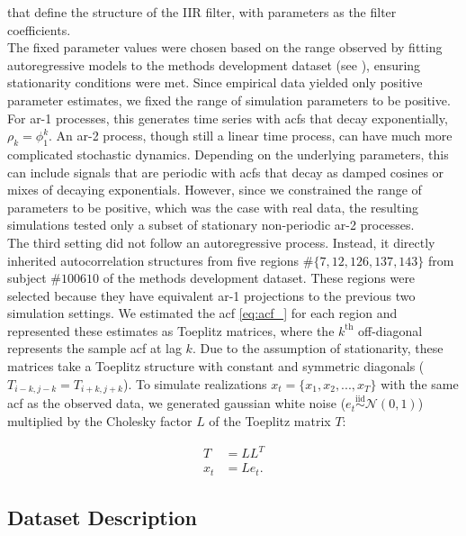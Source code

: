 \documentclass[main.tex]{subfiles}
\begin{document}
that define the structure of the IIR filter, with parameters as the filter coefficients. \\

The fixed parameter values were chosen based on the range observed by fitting autoregressive models to the methods development dataset (see ), ensuring stationarity conditions were met. Since empirical data yielded only positive parameter estimates, we fixed the range of simulation parameters to be positive. For ar-1 processes, this generates time series with acfs that decay exponentially, $\rho_k = \phi_1^k$. An ar-2 process, though still a linear time process, can have much more complicated stochastic dynamics. Depending on the underlying parameters, this can include signals that are periodic with acfs that decay as damped cosines or mixes of decaying exponentials. However, since we constrained the range of parameters to be positive, which was the case with real data, the resulting simulations tested only a subset of stationary non-periodic ar-2 processes.\\

The third setting did not follow an autoregressive process. Instead, it directly inherited autocorrelation structures from five regions $\# \{7, 12, 126, 137, 143\}$ from subject $\#100610$ of the methods development dataset. These regions were selected because they have equivalent ar-1 projections to the previous two simulation settings. We estimated the acf \eqref{eq:acf_} for each region and represented these estimates as Toeplitz matrices, where the $k^{\text{th}}$ off-diagonal represents the sample acf at lag $k$. Due to the assumption of stationarity, these matrices take a Toeplitz structure with constant and symmetric diagonals ($T_{i-k, j-k} = T_{i+k, j+k}$). To simulate realizations $x_t = \{x_1, x_2, ..., x_T\}$ with the same acf as the observed data, we generated gaussian white noise ($e_t \overset{\text{iid}}{\sim} \mathcal{N}(0, 1)$) multiplied by the Cholesky factor $L$ of the Toeplitz matrix $T$:

\begin{align*}
    T &= LL^T\\
    x_t &= L e_t.
\end{align*}

\subsection{Dataset Description}\label{sec:dataset-description}
\end{document}

